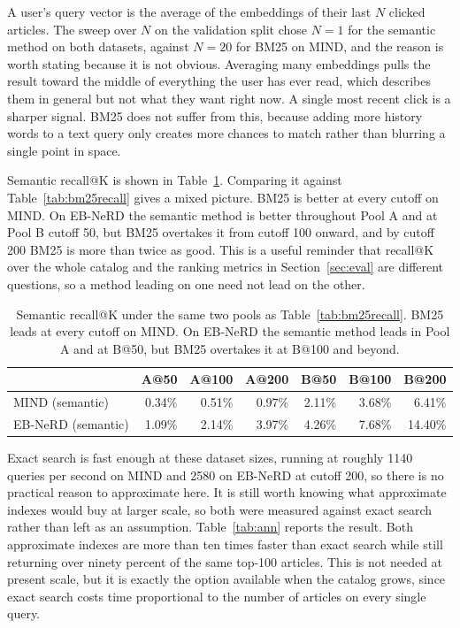 \documentclass[11pt]{article}
\begin{document}
A user's query vector is the average of the embeddings of their last $N$ clicked articles. The
sweep over $N$ on the validation split chose $N=1$ for the semantic method on both datasets,
against $N=20$ for BM25 on MIND, and the reason is worth stating because it is not obvious.
Averaging many embeddings pulls the result toward the middle of everything the user has ever
read, which describes them in general but not what they want right now. A single most recent
click is a sharper signal. BM25 does not suffer from this, because adding more history words
to a text query only creates more chances to match rather than blurring a single point in
space.

Semantic recall@K is shown in Table~\ref{tab:semrecall}. Comparing it against
Table~\ref{tab:bm25recall} gives a mixed picture. BM25 is better at every cutoff on MIND. On
EB-NeRD the semantic method is better throughout Pool A and at Pool B cutoff 50, but BM25
overtakes it from cutoff 100 onward, and by cutoff 200 BM25 is more than twice as good. This is
a useful reminder that recall@K over the whole catalog and the ranking metrics in
Section~\ref{sec:eval} are different questions, so a method leading on one need not lead on
the other.

\begin{table}[t]
\centering
\begin{tabular}{lrrrrrr}
\toprule
 & A@50 & A@100 & A@200 & B@50 & B@100 & B@200 \\
\midrule
MIND (semantic) & 0.34\% & 0.51\% & 0.97\% & 2.11\% & 3.68\% & 6.41\% \\
EB-NeRD (semantic) & 1.09\% & 2.14\% & 3.97\% & 4.26\% & 7.68\% & 14.40\% \\
\bottomrule
\end{tabular}
\caption{Semantic recall@K under the same two pools as Table~\ref{tab:bm25recall}. BM25 leads
at every cutoff on MIND. On EB-NeRD the semantic method leads in Pool A and at B@50, but BM25
overtakes it at B@100 and beyond.}
\label{tab:semrecall}
\end{table}

Exact search is fast enough at these dataset sizes, running at roughly 1140 queries per second
on MIND and 2580 on EB-NeRD at cutoff 200, so there is no practical reason to approximate here.
It is still worth knowing what approximate indexes would buy at larger scale, so both were
measured against exact search rather than left as an assumption. Table~\ref{tab:ann} reports
the result. Both approximate indexes are more than ten times faster than exact search while
still returning over ninety percent of the same top-100 articles. This is not needed at
present scale, but it is exactly the option available when the catalog grows, since exact
search costs time proportional to the number of articles on every single query.
\end{document}
